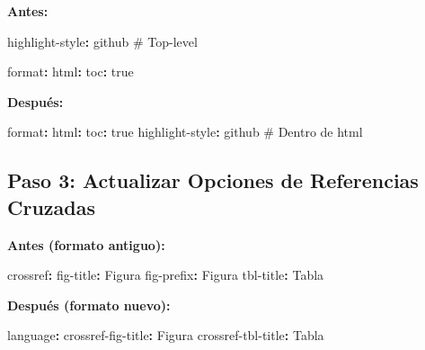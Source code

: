 \documentclass[
  doc,
  floatsintext,
  longtable,
  a4paper,
  nolmodern,
  notxfonts,
  notimes,
  12pt,
  colorlinks=true,linkcolor=blue,citecolor=blue,urlcolor=blue]{apa7}
\newenvironment{Shaded}{\begin{snugshade}}{\end{snugshade}}
\newcommand{\AttributeTok}[1]{\textcolor[rgb]{0.40,0.45,0.13}{#1}}
\newcommand{\CharTok}[1]{\textcolor[rgb]{0.13,0.47,0.30}{#1}}
\newcommand{\CommentTok}[1]{\textcolor[rgb]{0.37,0.37,0.37}{#1}}
\newcommand{\FunctionTok}[1]{\textcolor[rgb]{0.28,0.35,0.67}{#1}}
\newcommand{\KeywordTok}[1]{\textcolor[rgb]{0.00,0.23,0.31}{\textbf{#1}}}
\begin{document}
\textbf{Antes:}

\begin{Shaded}
\begin{Highlighting}[]
\FunctionTok{highlight{-}style}\KeywordTok{:}\AttributeTok{ github}\CommentTok{       \#  Top{-}level}

\FunctionTok{format}\KeywordTok{:}
\AttributeTok{  }\FunctionTok{html}\KeywordTok{:}
\AttributeTok{    }\FunctionTok{toc}\KeywordTok{:}\AttributeTok{ }\CharTok{true}
\end{Highlighting}
\end{Shaded}

\textbf{Después:}

\begin{Shaded}
\begin{Highlighting}[]
\FunctionTok{format}\KeywordTok{:}
\AttributeTok{  }\FunctionTok{html}\KeywordTok{:}
\AttributeTok{    }\FunctionTok{toc}\KeywordTok{:}\AttributeTok{ }\CharTok{true}
\AttributeTok{    }\FunctionTok{highlight{-}style}\KeywordTok{:}\AttributeTok{ github}\CommentTok{   \# Dentro de html}
\end{Highlighting}
\end{Shaded}

\subsection{Paso 3: Actualizar Opciones de Referencias
Cruzadas}\label{paso-3-actualizar-opciones-de-referencias-cruzadas}

\textbf{Antes (formato antiguo):}

\begin{Shaded}
\begin{Highlighting}[]
\FunctionTok{crossref}\KeywordTok{:}
\AttributeTok{  }\FunctionTok{fig{-}title}\KeywordTok{:}\AttributeTok{ Figura}
\AttributeTok{  }\FunctionTok{fig{-}prefix}\KeywordTok{:}\AttributeTok{ Figura}
\AttributeTok{  }\FunctionTok{tbl{-}title}\KeywordTok{:}\AttributeTok{ Tabla}
\end{Highlighting}
\end{Shaded}

\textbf{Después (formato nuevo):}

\begin{Shaded}
\begin{Highlighting}[]
\FunctionTok{language}\KeywordTok{:}
\AttributeTok{  }\FunctionTok{crossref{-}fig{-}title}\KeywordTok{:}\AttributeTok{ Figura}
\AttributeTok{  }\FunctionTok{crossref{-}tbl{-}title}\KeywordTok{:}\AttributeTok{ Tabla}
\end{Highlighting}
\end{Shaded}
\end{document}
